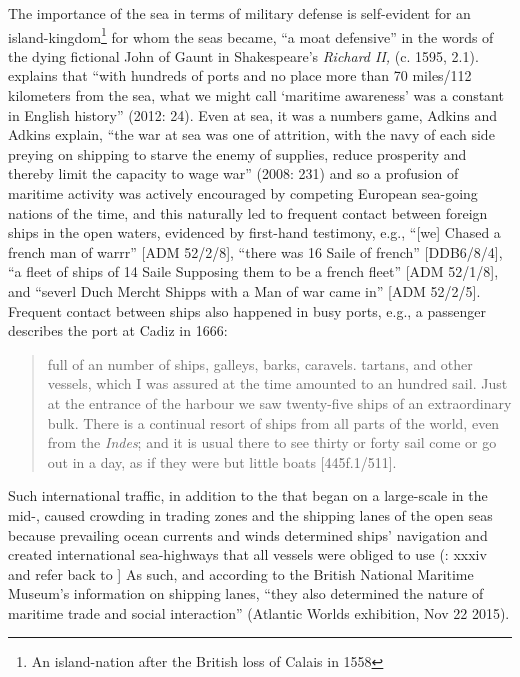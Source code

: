 The importance of the sea in terms of military defense is self-evident for an island-kingdom\footnote{An island-nation after the British loss of Calais in 1558} for whom the seas became, “a moat defensive” in the words of the dying fictional John of Gaunt in Shakespeare’s \textit{Richard II,} (c. 1595, 2.1). \citeauthor{Bicheno2012} explains that “with hundreds of ports and no place more than 70 miles/112 kilometers from the sea, what we might call ‘maritime awareness’ was a constant in English history” (2012: 24). Even at sea, it was a numbers game, Adkins and Adkins explain, “the war at sea was one of attrition, with the navy of each side preying on  shipping to starve the enemy of supplies, reduce prosperity and thereby limit the capacity to wage war” (2008: 231) and so a profusion of maritime activity was actively encouraged by competing European sea-going nations of the time, and this naturally led to frequent contact between foreign ships in the open waters, evidenced by first-hand testimony, e.g., “[we] Chased a french man of warrr” [ADM 52/2/8], “there was 16 Saile of french” [DDB6/8/4], “a fleet of ships of 14 Saile Supposing them to be a french fleet” [ADM 52/1/8], and “severl Duch Mercht Shipps with a Man of war came in” [ADM 52/2/5]. Frequent contact between ships also happened in busy ports, e.g., a passenger describes the port at Cadiz in 1666:

\begin{quotation}
full of an  number of ships, galleys, barks, caravels. tartans, and other vessels, which I was assured at the time amounted to an hundred sail. Just at the entrance of the harbour we saw twenty-five ships of an extraordinary bulk. There is a continual resort of ships from all parts of the world, even from the \textit{Indes}; and it is usual there to see thirty or forty sail come or go out in a day, as if they were but little boats [445f.1/511]. 
\end{quotation}

Such international traffic, in addition to the   that began on a large-scale in the mid-, caused crowding in trading zones and the shipping lanes of the open seas because prevailing ocean currents and winds determined ships’ navigation and created international sea-highways that all vessels were obliged to use (\citealt{AdkinsAdkins2008}: xxxiv and refer back to ] As such, and according to the British National Maritime Museum’s information on shipping lanes, “they also determined the nature of maritime trade and social interaction” (Atlantic Worlds exhibition, Nov 22 2015).  

